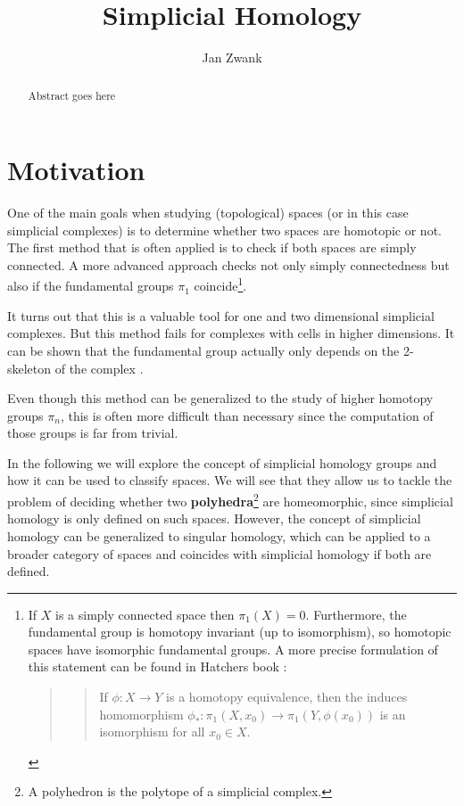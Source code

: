 \documentclass[draft]{scrartcl}
\title{Simplicial Homology}
\author{Jan Zwank}
\theoremstyle{plain}
\theoremstyle{definition}
\theoremstyle{remark}
\newcommand{\sh}{simplicial homology}
\newcommand{\scs}{simplicial complexes}
\begin{document}
	\maketitle
	
	\begin{abstract}
		Abstract goes here
	\end{abstract}
\tableofcontents

\clearpage

\section{Motivation}\label{motivation}
One of the main goals when studying (topological) spaces (or in this case \scs) is to determine whether two spaces are homotopic
 or not. The first method that is often applied is to check if both spaces are simply connected. A more advanced approach checks not only simply connectedness but also if the fundamental groups $\pi_1$ coincide\footnote{If $X$ is a simply connected space then $\pi_1(X)=0$. Furthermore, the fundamental group is homotopy invariant (up to isomorphism), so homotopic spaces have isomorphic fundamental groups. A more precise formulation of this statement can be found in Hatchers book \parencite[Prop. 1.18, p. 37]{ha}:
\begin{quotation}
	\begin{quote}
		If $\phi: X\to Y$ is a homotopy equivalence, then the induces homomorphism $\phi_*:\pi_1(X,x_0)\to\pi_1(Y,\phi(x_0))$ is an isomorphism for all $x_0\in X$.
	\end{quote}
\end{quotation} }.

It turns out that this is a valuable tool for one and two dimensional \scs. But this method fails for complexes with cells in higher dimensions. It can be shown that the fundamental group actually only depends on the 2-skeleton of the complex \cite[vgl.][p. 173]{ar}. 

Even though this method can be generalized to the study of higher homotopy groups $\pi_n$, this is often more difficult than necessary since the computation of those groups is far from trivial.

In the following we will explore the concept of \sh{} groups and how it can be used to classify spaces. We will see that they allow us to tackle the problem of deciding whether two \textbf{polyhedra}\footnote{A polyhedron is the polytope of a simplicial complex.} are homeomorphic, since simplicial homology is only defined on such spaces. However, the concept of \sh{} can be generalized to singular homology, which can be applied to a broader category of spaces and coincides with \sh{} if both are defined.
\end{document}
